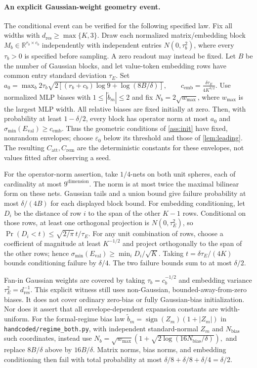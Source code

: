 \paragraph{An explicit Gaussian-weight geometry event.}
\label{app:t2-gaussian-geometry}
The conditional event can be verified for the following specified law.
Fix all widths with $d_{\mathrm{res}}\ge\max\{K,3\}$. Draw each normalized
matrix/embedding block $M_b\in\mathbb R^{r_b\times c_b}$ independently
with independent entries $N(0,\tau_b^2)$, where every $\tau_b>0$ is
specified before sampling. A zero readout may instead be fixed. Let $B$
be the number of Gaussian blocks, and let value-token embedding rows
have common entry standard deviation $\tau_E$. Set
 $a_0=\max_b 2\tau_b\sqrt{2[(r_b+c_b)\log9+\log(8B/\delta)]},\qquad c_{\mathrm{emb}}=\frac{\delta\tau_E}{4K^{3/2}}.$ 
Use normalized MLP biases with $1\le|\tilde b_m|\le2$ and fix
$N_b=2\sqrt{w_{\max}}$, where $w_{\max}$ is the largest MLP width.
All relative biases are fixed initially at zero. Then, with probability
at least $1-\delta/2$, every block has operator norm at most $a_0$ and
$\sigma_{\min}(E_{\mathrm{val}})\ge c_{\mathrm{emb}}$. Thus the geometric
conditions of \cref{ass:init} have fixed, nonrandom envelopes; choose
$\varepsilon_0$ below its threshold and those of \cref{lem:leading}.
The resulting $C_{\mathrm{att}},C_{\mathrm{rem}}$ are the deterministic
constants for these envelopes, not values fitted after observing a seed.

For the operator-norm assertion, take $1/4$-nets on both unit spheres,
each of cardinality at most $9^{\mathrm{dimension}}$. The norm is at most
twice the maximal bilinear form on these nets. Gaussian tails and a union
bound give failure probability at most $\delta/(4B)$ for each displayed
block bound. For embedding conditioning, let $D_i$ be the distance of
row $i$ to the span of the other $K-1$ rows. Conditional on those rows,
at least one orthogonal projection is $N(0,\tau_E^2)$, so
$\Pr(D_i<t)\le\sqrt{2/\pi}\,t/\tau_E$. For any unit combination of rows,
choose a coefficient of magnitude at least $K^{-1/2}$ and project
orthogonally to the span of the other rows; hence
$\sigma_{\min}(E_{\mathrm{val}})\ge\min_i D_i/\sqrt K$.
Taking $t=\delta\tau_E/(4K)$ bounds conditioning failure by $\delta/4$.
The two failure bounds sum to at most $\delta/2$.

Fan-in Gaussian weights are covered by taking $\tau_b=c_b^{-1/2}$ and
embedding variance $\tau_E^2=d_{\mathrm{res}}^{-1}$. This explicit witness
still uses non-Gaussian, bounded-away-from-zero biases. It does not cover
ordinary zero-bias or fully Gaussian-bias initialization. Nor does it
assert that all envelope-dependent expansion constants are width-uniform.
For the formal-regime bias law $\tilde b_m=\operatorname{sign}(Z_m)(1+|Z_m|)$
in \nolinkurl{handcoded/regime_both.py}, with independent standard-normal
$Z_m$ and $N_{\mathrm{bias}}$ such coordinates, instead use
 $N_b=\sqrt{w_{\max}}\left(1+\sqrt{2\log(16N_{\mathrm{bias}}/\delta)}\right),$ 
and replace $8B/\delta$ above by $16B/\delta$. Matrix norms, bias norms,
and embedding conditioning then fail with total probability at most
$\delta/8+\delta/8+\delta/4=\delta/2$.

